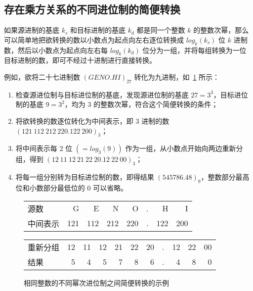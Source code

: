     \subsection{存在乘方关系的不同进位制的简便转换}\label{subsec:NumberSystemBasics/PositionalNotationConversion/PoweredBase}
        如果源进制的基底 $k_s$ 和目标进制的基底 $k_d$ 都是同一个整数 $k$ 的整数次幂，那么可以简单地把欲转换的数以小数点为起点向左右逐位转换成 $log_k(k_s)$ 位 $k$ 进制数，然后以小数点为起点向左右每 $log_k(k_d)$ 位分为一组，并将每组转换为一位目标进制的数，即可不经过十进制进行直接转换。

        例如，欲将二十七进制数 $(GENO.HI)_{27}$ 转化为九进制，如~\ref{fig:NumberSystemBasics/PositionalNotationConversion/PoweredBase/WithIntermediate} 所示：

        \begin{enumerate}
            \item 检查源进位制与目标进位制的基底，发现源进位制的基底 $27 = 3 ^ 3$，目标进位制的基底 $9 = 3 ^ 2$，均为 $3$ 的整数次幂，符合这个简便转换的条件；
            \item 将欲转换的数逐位转化为中间表示，即 $3$ 进制的数 $(121\ 112\ 212\ 220.122\ 200)_3$；
            \item 将中间表示每 $2$ 位 $(= log_3(9))$ 作为一组，从小数点开始向两边重新分组，得到 $(12\ 11\ 12\ 21\ 22\ 20.12\ 22\ 00)_3$；
            \item 将每一组分别转为目标进位制的数，即得结果 $(545786.48)_9$，整数部分最高位和小数部分最低位的 $0$ 可以省略。
        \end{enumerate}

        \begin{figure}
            \centering
            \begin{tabular}{lrrrrrrr}
                源数     &   G &   E &   N &   O & . &   H &   I \\
                中间表示 & 121 & 112 & 212 & 220 & . & 122 & 200 \\ \hline
            \end{tabular}
            \begin{tabular}{lrrrrrrrrrr}
                重新分组 & 12 & 11 & 12 & 21 & 22 & 20 & . & 12 & 22 & 00 \\
                结果     &  5 &  4 &  5 &  7 &  8 &  6 & . &  4  &  8 &  0
            \end{tabular}
            \caption{相同整数的不同幂次进位制之间简便转换的示例}
            \label{fig:NumberSystemBasics/PositionalNotationConversion/PoweredBase/WithIntermediate}
        \end{figure}
